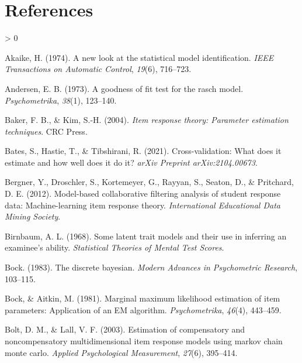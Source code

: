 \documentclass[
  english,
  man,floatsintext]{apa7}
\newlength{\cslhangindent}
\newenvironment{CSLReferences}[2] %
 {%
  \setlength{\parindent}{0pt}
  \ifodd #1 \everypar{\setlength{\hangindent}{\cslhangindent}}\ignorespaces\fi
  \ifnum #2 > 0
  \setlength{\parskip}{#2\baselineskip}
  \fi
 }%
 {}
\begin{document}
\clearpage

\hypertarget{references}{%
\section{References}\label{references}}

\begingroup
\setlength{\parindent}{-0.5in}
\setlength{\leftskip}{0.5in}

\hypertarget{refs}{}
\begin{CSLReferences}{1}{0}
\leavevmode\hypertarget{ref-akaike1974new}{}%
Akaike, H. (1974). A new look at the statistical model identification. \emph{IEEE Transactions on Automatic Control}, \emph{19}(6), 716--723.

\leavevmode\hypertarget{ref-andersen1973goodness}{}%
Andersen, E. B. (1973). A goodness of fit test for the rasch model. \emph{Psychometrika}, \emph{38}(1), 123--140.

\leavevmode\hypertarget{ref-baker2004item}{}%
Baker, F. B., \& Kim, S.-H. (2004). \emph{Item response theory: Parameter estimation techniques}. CRC Press.

\leavevmode\hypertarget{ref-bates2021cross}{}%
Bates, S., Hastie, T., \& Tibshirani, R. (2021). Cross-validation: What does it estimate and how well does it do it? \emph{arXiv Preprint arXiv:2104.00673}.

\leavevmode\hypertarget{ref-bergner2012model}{}%
Bergner, Y., Droschler, S., Kortemeyer, G., Rayyan, S., Seaton, D., \& Pritchard, D. E. (2012). Model-based collaborative filtering analysis of student response data: Machine-learning item response theory. \emph{International Educational Data Mining Society}.

\leavevmode\hypertarget{ref-birnbaum1968some}{}%
Birnbaum, A. L. (1968). Some latent trait models and their use in inferring an examinee's ability. \emph{Statistical Theories of Mental Test Scores}.

\leavevmode\hypertarget{ref-bock1983discrete}{}%
Bock. (1983). The discrete bayesian. \emph{Modern Advances in Psychometric Research}, 103--115.

\leavevmode\hypertarget{ref-bock1981marginal}{}%
Bock, \& Aitkin, M. (1981). Marginal maximum likelihood estimation of item parameters: Application of an EM algorithm. \emph{Psychometrika}, \emph{46}(4), 443--459.

\leavevmode\hypertarget{ref-bolt2003estimation}{}%
Bolt, D. M., \& Lall, V. F. (2003). Estimation of compensatory and noncompensatory multidimensional item response models using markov chain monte carlo. \emph{Applied Psychological Measurement}, \emph{27}(6), 395--414.


\end{CSLReferences}
\end{document}
